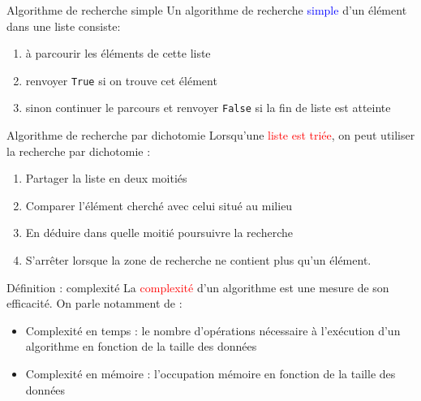 \documentclass[10pt]{beamer}
\begin{document}
\begin{frame}
	\mframe{\NA}
	\begin{block}{Algorithme de recherche simple}
		Un algorithme de recherche \textcolor{blue}{simple} d'un élément dans une liste consiste:
		\begin{enumerate}
			\item<2-> à parcourir les éléments de cette liste
			\item<3-> renvoyer {\tt True} si on trouve cet élément
			\item<4-> sinon continuer le parcours et renvoyer {\tt False} si la fin de liste est atteinte
		\end{enumerate}
	\end{block}	
\end{frame}

\begin{frame}
	\mframe{\NA}
	\begin{block}{Algorithme de recherche par dichotomie}
		Lorsqu'une \textcolor{red}{liste est triée}, on peut utiliser la recherche par dichotomie :
		\begin{enumerate}
			\item<2-> Partager la liste en deux moitiés
			\item<3-> Comparer l'élément cherché avec celui situé au milieu
			\item<4-> En déduire dans quelle moitié poursuivre la recherche
			\item<5-> S'arrêter lorsque la zone de recherche ne contient plus qu'un élément.
		\end{enumerate}
	\end{block}	
\end{frame}


\begin{frame}
	\mframe{\NA}
	\begin{alertblock}{Définition : complexité}
		La \textcolor{red}{complexité} d'un algorithme est une mesure de son efficacité.
		\onslide<2-> On parle notamment de :
		\begin{itemize}
			\item<3-> Complexité en temps : le nombre d'opérations nécessaire à l'exécution d'un algorithme en fonction de la taille des données
			\item<4-> Complexité en mémoire : l'occupation mémoire en fonction de la taille des données
		\end{itemize}
	\end{alertblock}
\end{frame}
\end{document}
